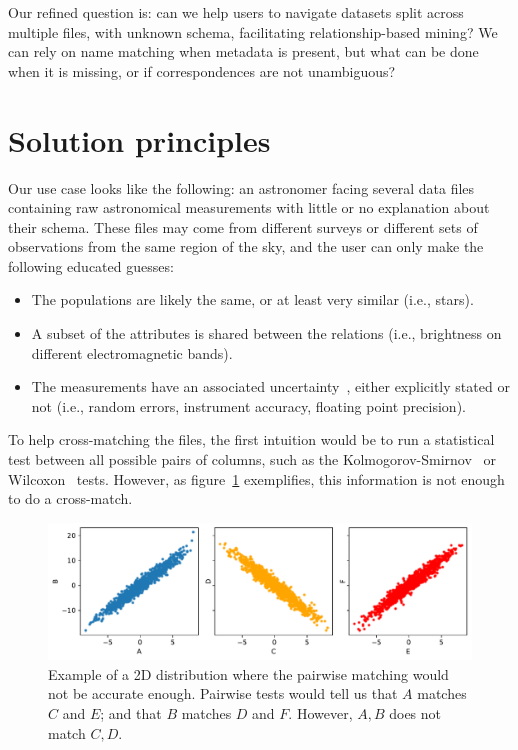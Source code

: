 Our refined question is: can we help users to navigate datasets split across multiple
files, with unknown schema, facilitating relationship-based mining?
We can rely on name matching when metadata is present, but what can be done when
it is missing, or if correspondences are not unambiguous?

\section{Solution principles}
\label{sec:gaps/principles}

Our use case looks like the following: an astronomer facing several
data files containing raw astronomical measurements
with little or no explanation about their schema. These files may come from different
surveys or different sets of observations from the same region of the sky,
and the user can only make the following educated guesses:

\begin{itemize}
    \item The populations are likely the same, or at least very similar
    (i.e., stars).
    \item A subset of the attributes is shared between the relations (i.e.,
    brightness on different electromagnetic bands).
    \item The measurements have an associated uncertainty~\cite{Stonebraker2009},
    either explicitly stated or not (i.e., random errors, instrument accuracy,
    floating point precision).
\end{itemize}

To help cross-matching the files, the first intuition would be to run a statistical
test between all possible pairs of columns,
such as the Kolmogorov-Smirnov~\cite{Hodges1958} or Wilcoxon~\cite{Wilcoxon1945} tests.
However, as figure~\ref{fig:pairwise_ind} exemplifies, this information is not enough to 
do a cross-match.

\begin{figure}[htpb]
    \centering
    \includegraphics[width=\linewidth]{images/4_gaps/no2ind}
    \caption[Example of a 2D distribution where the pairwise matching is not enough.]{
        Example of a 2D distribution where the pairwise matching would not be accurate enough.
        Pairwise tests would tell us that $A$ matches $C$ and $E$; and that $B$ matches $D$ and $F$.
        However, $A,B$ does not match $C,D$.
    }
    \label{fig:pairwise_ind}
\end{figure}

